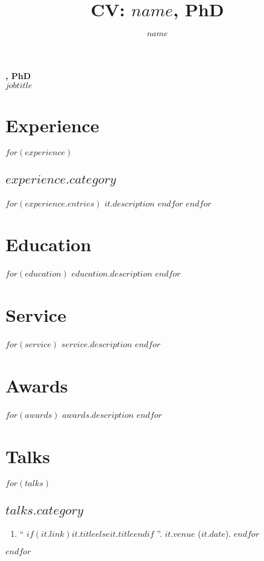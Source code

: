\documentclass[11pt]{article}
\title{CV: $name$, PhD}
\author{$name$}
\date{}
\makeatletter
\renewcommand\maketitle{
    {\noindent\Large\sffamily\bfseries \@author, PhD\\
		\large\normalfont\itshape $jobtitle$}
  }
\makeatother
\begin{document}
%
\thispagestyle{empty}

\maketitle

\section{Experience}
$for(experience)$
\subsection{$experience.category$}
$for(experience.entries)$
$it.description$
$endfor$
$endfor$

\section{Education}
$for(education)$
$education.description$
$endfor$

\vspace{14pt}
\section{Service}
$for(service)$
$service.description$
$endfor$

\section{Awards}
$for(awards)$
$awards.description$
$endfor$

\section{Talks}
$for(talks)$
\subsection{$talks.category$}
\begin{enumerate}
$for(talks.entries)$
\item ``%
	$if(it.link)$\href{$it.link$}{$it.title$}$else$$it.title$$endif$%
	''. $it.venue$ ($it.date$).
$endfor$
\end{enumerate}
$endfor$
\end{document}
